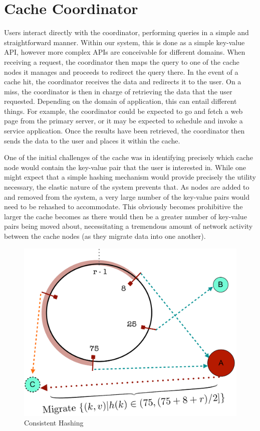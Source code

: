 \section{Cache Coordinator} %
\label{sec:Cache_Coordinator}
Users interact directly with the coordinator, performing queries in a simple
and straightforward manner. Within our system, this is done as a simple
key-value API, however more complex APIs are conceivable for different domains.
When receiving a request, the coordinator then maps the query to one of the
cache nodes it manages and proceeds to redirect the query there. In the event
of a cache hit, the coordinator receives the data and redirects it to the user.
On a miss, the coordinator is then in charge of retrieving the data that the
user requested. Depending on the domain of application, this can entail
different things. For example, the coordinator could be expected to go and
fetch a web page from the primary server, or it may be expected to schedule and
invoke a service application. Once the results have been retrieved, the
coordinator then sends the data to the user and places it within the cache.

One of the initial challenges of the cache was in identifying precisely which
cache node would contain the key-value pair that the user is interested in.
While one might expect that a simple hashing mechanism would provide precisely
the utility necessary, the elastic nature of the system prevents that. As nodes
are added to and removed from the system, a very large number of the key-value
pairs would need to be rehashed to accommodate. This obviously becomes
prohibitive the larger the cache becomes as there would then be a greater
number of key-value pairs being moved about, necessitating a tremendous amount
of network activity between the cache nodes (as they migrate data into one
another).

\begin{figure}
\begin{center}
\includegraphics[scale=0.5]{figures/hashing.pdf}
\end{center}
\caption{Consistent Hashing}
\label{fig:hashing}
\end{figure}

